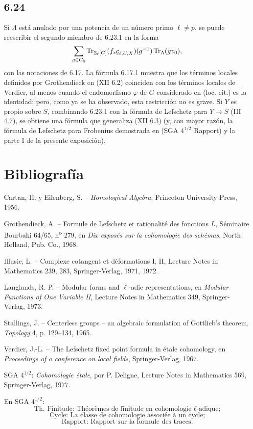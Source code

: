 \subsection*{6.24}
Si $\Lambda$ está anulado por una potencia de un número primo $\ell\ne p$, se puede reescribir el segundo miembro de 6.23.1 en la forma
\[
\sum_{g\in G_{\natural}}
\operatorname{Tr}_{\mathbb Z_{\ell}[G]}(f_*\underline c_{\ell,U,X})(g^{-1})
\operatorname{Tr}_{\Lambda}(gv_0),
\]
con las notaciones de 6.17. La fórmula 6.17.1 muestra que los términos locales definidos por Grothendieck en (XII 6.2) coinciden con los términos locales de Verdier, al menos cuando el endomorfismo $\varphi$ de $G$ considerado en (loc. cit.) es la identidad; pero, como ya se ha observado, esta restricción no es grave. Si $Y$ es propio sobre $S$, combinando 6.23.1 con la fórmula de Lefschetz para $Y\to S$ (III 4.7), se obtiene una fórmula que generaliza (XII 6.3) (y, con mayor razón, la fórmula de Lefschetz para Frobenius demostrada en (SGA $4^{1/2}$ Rapport) y la parte I de la presente exposición).

\section*{Bibliografía}

\begin{enumerate}[label={[\arabic*]}]
\item Cartan, H. y Eilenberg, S. -- \textit{Homological Algebra}, Princeton University Press, 1956.
\item Grothendieck, A. -- Formule de Lefschetz et rationalité des fonctions $L$, Séminaire Bourbaki 64/65, n\textsuperscript{o} 279, en \textit{Dix exposés sur la cohomologie des schémas}, North Holland, Pub. Co., 1968.
\item Illusie, L. -- Complexe cotangent et déformations I, II, Lecture Notes in Mathematics 239, 283, Springer-Verlag, 1971, 1972.
\item Langlands, R. P. -- Modular forms and $\ell$-adic representations, en \textit{Modular Functions of One Variable II}, Lecture Notes in Mathematics 349, Springer-Verlag, 1973.
\item Stallings, J. -- Centerless groups -- an algebraic formulation of Gottlieb's theorem, \textit{Topology} 4, p. 129--134, 1965.
\item Verdier, J.-L. -- The Lefschetz fixed point formula in étale cohomology, en \textit{Proceedings of a conference on local fields}, Springer-Verlag, 1967.
\end{enumerate}

SGA $4^{1/2}$: \textit{Cohomologie étale}, por P. Deligne, Lecture Notes in Mathematics 569, Springer-Verlag, 1977.

En SGA $4^{1/2}$:
\[
\text{Th. Finitude: Théorèmes de finitude en cohomologie }\ell\text{-adique;}
\]
\[
\text{Cycle: La classe de cohomologie associée à un cycle;}
\]
\[
\text{Rapport: Rapport sur la formule des traces.}
\]
